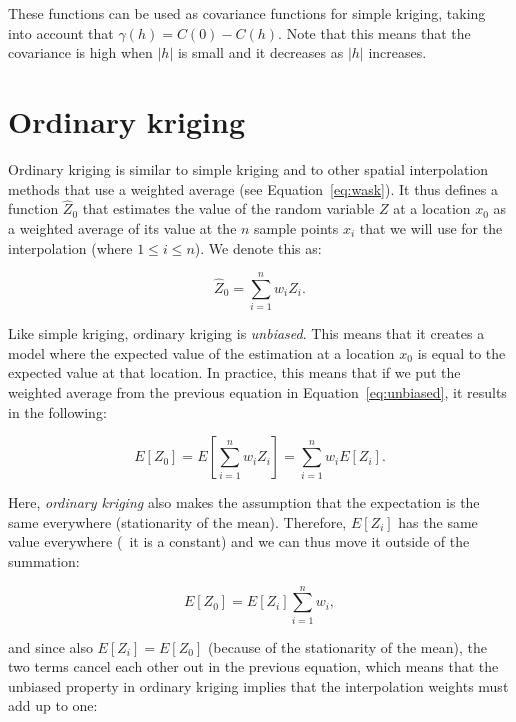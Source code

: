 These functions can be used as covariance functions for simple kriging, taking into account that \(\gamma(h) = C(0) - C(h)\).
Note that this means that the covariance is high when \(|h|\) is small and it decreases as \(|h|\) increases.

\section{Ordinary kriging}%

Ordinary kriging is similar to simple kriging and to other spatial interpolation methods that use a weighted average (see Equation~\ref{eq:wask}).
It thus defines a function \(\hat{Z}_0\) that estimates the value of the random variable \(Z\) at a location \(x_0\) as a weighted average of its value at the \(n\) sample points \(x_i\) that we will use for the interpolation (where \(1 \leq i \leq n\)).
We denote this as:

\begin{equation}
\label{eq:waok}
\hat{Z}_0 = \sum_{i=1}^n w_i Z_i.
\end{equation}

Like simple kriging, ordinary kriging is \emph{unbiased}.
This means that it creates a model where the expected value of the estimation at a location \(x_0\) is equal to the expected value at that location.
In practice, this means that if we put the weighted average from the previous equation in Equation~\ref{eq:unbiased}, it results in the following:

\begin{equation}
E\left[ Z_0 \right] = E\left[ \sum_{i=1}^n w_i Z_i\right] = \sum_{i=1}^n w_i E\left[Z_i\right].
\end{equation}

Here, \emph{ordinary kriging} also makes the assumption that the expectation is the same everywhere (stationarity of the mean).
Therefore, \(E\left[Z_i\right]\) has the same value everywhere (\ie\ it is a constant) and we can thus move it outside of the summation:

\begin{equation}
E\left[ Z_0 \right] = E\left[Z_i\right] \sum_{i=1}^n w_i,
\end{equation}

and since also \(E\left[Z_i\right] = E\left[ Z_0 \right] \) (because of the stationarity of the mean), the two terms cancel each other out in the previous equation, which means that the unbiased property in ordinary kriging implies that the interpolation weights must add up to one:

